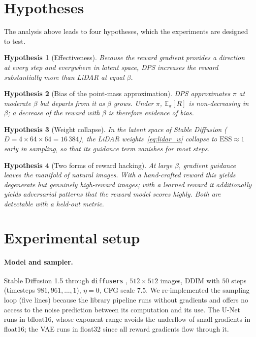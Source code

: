 \documentclass[11pt]{article}
\newtheorem{hypothesis}{Hypothesis}
\newcommand{\E}{\mathbb{E}}
\newcommand{\ESS}{\mathrm{ESS}}
\begin{document}
\section{Hypotheses}
\label{sec:hypotheses}
The analysis above leads to four hypotheses, which the experiments are designed to test.
\begin{hypothesis}[Effectiveness]\label{h:eff}
Because the reward gradient provides a direction at every step and everywhere in latent space, DPS increases the reward substantially more than LiDAR at equal $\beta$.
\end{hypothesis}
\begin{hypothesis}[Bias of the point-mass approximation]\label{h:bias}
DPS approximates $\pi$ at moderate $\beta$ but departs from it as $\beta$ grows. Under $\pi$, $\E_\pi[R]$ is non-decreasing in $\beta$; a decrease of the reward with $\beta$ is therefore evidence of bias.
\end{hypothesis}
\begin{hypothesis}[Weight collapse]\label{h:collapse}
In the latent space of Stable Diffusion ($D=4\times64\times64=16\,384$), the LiDAR weights~\eqref{eq:lidar_w} collapse to $\ESS\approx1$ early in sampling, so that its guidance term vanishes for most steps.
\end{hypothesis}
\begin{hypothesis}[Two forms of reward hacking]\label{h:hack}
At large $\beta$, gradient guidance leaves the manifold of natural images. With a hand-crafted reward this yields degenerate but genuinely high-reward images; with a learned reward it additionally yields adversarial patterns that the reward model scores highly. Both are detectable with a held-out metric.
\end{hypothesis}

\section{Experimental setup}
\label{sec:setup}

\paragraph{Model and sampler.} Stable Diffusion 1.5 \citep{rombach2022ldm} through \texttt{diffusers} \citep{vonplaten2022diffusers}, $512\times512$ images, DDIM with $50$ steps (timesteps $981, 961,\dots,1$), $\eta=0$, CFG scale $7.5$. We re-implemented the sampling loop (five lines) because the library pipeline runs without gradients and offers no access to the noise prediction between its computation and its use. The U-Net runs in bfloat16, whose exponent range avoids the underflow of small gradients in float16; the VAE runs in float32 since all reward gradients flow through it.
\end{document}
